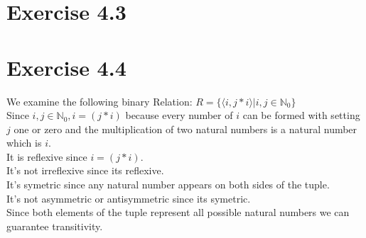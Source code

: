 \documentclass{article} %
\newcommand{\homeworkNumber}{4}
\begin{document}
\section*{Exercise \homeworkNumber.3}

\section*{Exercise \homeworkNumber.4}
We examine the following binary Relation: $R = \{ \langle i,j*i \rangle \lvert i,j \in \mathbb N_0\}$ \\
Since $ i,j \in \mathbb N_0 , i = (j*i)$ because every number of $i$ can be formed with setting $j$ one or zero and the multiplication of two natural numbers is a natural number which is $i$.\\
It is reflexive since $i = (j*i)$. \\
It's not irreflexive since its reflexive. \\
It's symetric since any natural number appears on both sides of the tuple. \\
It's not asymmetric or antisymmetric since its symetric. \\
Since both elements of the tuple represent all possible natural numbers we can guarantee transitivity. \\
\end{document}
